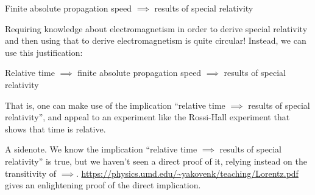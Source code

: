 \documentclass{article}
\begin{document}
\begin{center}
	Finite absolute propagation speed $\implies$ results of special relativity
\end{center}

Requiring knowledge about electromagnetism in order to derive special relativity and then using that to derive electromagnetism is quite circular! Instead, we can use this justification:

\begin{center}
	Relative time $\implies$ finite absolute propagation speed $\implies$ results of special relativity
\end{center}

That is, one can make use of the implication ``relative time $\implies$ results of special relativity'', and appeal to an experiment like the Rossi-Hall experiment that shows that time is relative.

A sidenote. We know the implication ``relative time $\implies$ results of special relativity'' is true, but we haven't seen a direct proof of it, relying instead on the transitivity of $\implies$. \url{https://physics.umd.edu/~yakovenk/teaching/Lorentz.pdf} gives an enlightening proof of the direct implication.
\end{document}
